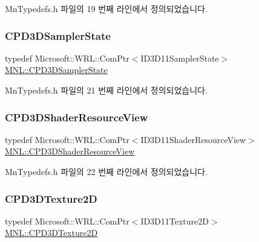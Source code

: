 Mn\+Typedefs.\+h 파일의 19 번째 라인에서 정의되었습니다.

\mbox{\label{namespace_m_n_l_ae0141196161ecb3d3055523077ca3aa1}} 
\subsubsection{\texorpdfstring{C\+P\+D3\+D\+Sampler\+State}{CPD3DSamplerState}}
{\footnotesize\ttfamily typedef Microsoft\+::\+W\+R\+L\+::\+Com\+Ptr$<$I\+D3\+D11\+Sampler\+State$>$ \hyperlink{namespace_m_n_l_ae0141196161ecb3d3055523077ca3aa1}{M\+N\+L\+::\+C\+P\+D3\+D\+Sampler\+State}}



Mn\+Typedefs.\+h 파일의 21 번째 라인에서 정의되었습니다.

\mbox{\label{namespace_m_n_l_a93794d93663474ff79c950ed985565aa}} 
\subsubsection{\texorpdfstring{C\+P\+D3\+D\+Shader\+Resource\+View}{CPD3DShaderResourceView}}
{\footnotesize\ttfamily typedef Microsoft\+::\+W\+R\+L\+::\+Com\+Ptr$<$I\+D3\+D11\+Shader\+Resource\+View$>$ \hyperlink{namespace_m_n_l_a93794d93663474ff79c950ed985565aa}{M\+N\+L\+::\+C\+P\+D3\+D\+Shader\+Resource\+View}}



Mn\+Typedefs.\+h 파일의 22 번째 라인에서 정의되었습니다.

\mbox{\label{namespace_m_n_l_addb538e1cbd1f443e6db5e6312487c51}} 
\subsubsection{\texorpdfstring{C\+P\+D3\+D\+Texture2D}{CPD3DTexture2D}}
{\footnotesize\ttfamily typedef Microsoft\+::\+W\+R\+L\+::\+Com\+Ptr$<$I\+D3\+D11\+Texture2D$>$ \hyperlink{namespace_m_n_l_addb538e1cbd1f443e6db5e6312487c51}{M\+N\+L\+::\+C\+P\+D3\+D\+Texture2D}}



